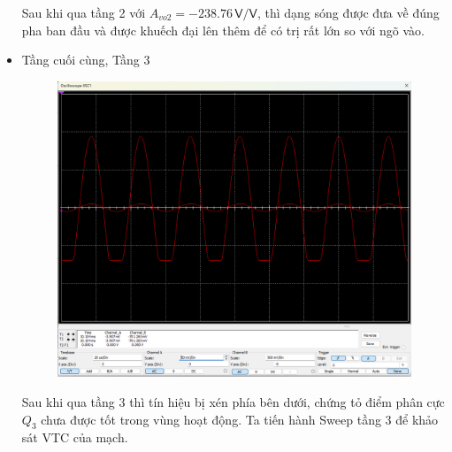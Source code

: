 \begin{itemize}[label=-]
	Sau khi qua tầng 2 với $A_{vo2} = -238.76 \,\textsf{V/V}$, thì dạng sóng được đưa về đúng pha ban đầu và được khuếch đại lên thêm để có trị rất lớn so với ngõ vào.
	
	\item Tầng cuối cùng, Tầng 3
	
	\begin{figure}[H]
		\centering
		\includegraphics[width=.8\linewidth]{./my-chapters/my-images/Question6/c_stage_3.png}
	\end{figure}
	
	Sau khi qua tầng 3 thì tín hiệu bị xén phía bên dưới, chứng tỏ điểm phân cực $Q_{3}$ chưa được tốt trong vùng hoạt động. Ta tiến hành Sweep tầng 3 để khảo sát VTC của mạch.
	

\end{itemize}
